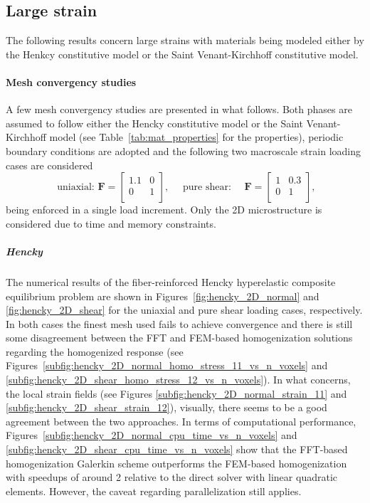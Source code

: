 \FloatBarrier

\subsection{Large strain}

The following results concern large strains with materials being modeled either by the Henkcy constitutive model or the Saint Venant-Kirchhoff constitutive model.

\paragraph{Mesh convergency studies}

A few mesh convergency studies are presented in what follows.
Both phases are assumed to follow either the Hencky constitutive model or the Saint Venant-Kirchhoff model (see Table~\ref{tab:mat_properties} for the properties), periodic boundary conditions are adopted and the following two macroscale strain loading cases are considered
\begin{equation}
\text { uniaxial: } \bm{F}=\left[\begin{array}{ll}
1.1 & 0 \\
0 & 1  \\
\end{array}\right], \quad \text { pure shear: } \quad \bm F=\left[\begin{array}{cc}
1 & 0.3 \\
0 & 1  \\
\end{array}\right],
\end{equation}
being enforced in a single load increment.
Only the 2D microstructure is considered due to time and memory constraints.

\subparagraph{Hencky}

The numerical results of the fiber-reinforced Hencky hyperelastic composite equilibrium problem are shown in Figures~\ref{fig:hencky_2D_normal} and \ref{fig:hencky_2D_shear} for the uniaxial and pure shear loading cases, respectively.
In both cases the finest mesh used fails to achieve convergence and there is still some disagreement between the FFT and FEM-based homogenization solutions regarding the homogenized response (see Figures~\ref{subfig:hencky_2D_normal_homo_stress_11_vs_n_voxels} and \ref{subfig:hencky_2D_shear_homo_stress_12_vs_n_voxels}).
In what concerns, the local strain fields (see Figures \ref{subfig:hencky_2D_normal_strain_11} and \ref{subfig:hencky_2D_shear_strain_12}), visually, there seems to be a good agreement between the two approaches.
In terms of computational performance, Figures~\ref{subfig:hencky_2D_normal_cpu_time_vs_n_voxels} and \ref{subfig:hencky_2D_shear_cpu_time_vs_n_voxels} show that the FFT-based homogenization Galerkin scheme outperforms the FEM-based homogenization with speedups of around 2 relative to the direct solver with linear quadratic elements.
However, the caveat regarding parallelization still applies.

